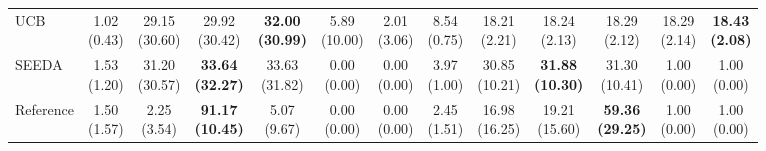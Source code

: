 {\begin{tabular}{l|cccccc|cccccc}
UCB & \makecell{1.02 \\ (0.43)} & {\cellcolor[HTML]{C8E6C9}} \makecell{29.15 \\ (30.60)} & \makecell{29.92 \\ (30.42)} & \bfseries \makecell{32.00 \\ (30.99)} & \makecell{5.89 \\ (10.00)} & \makecell{2.01 \\ (3.06)} & \makecell{8.54 \\ (0.75)} & {\cellcolor[HTML]{C8E6C9}} \makecell{18.21 \\ (2.21)} & \makecell{18.24 \\ (2.13)} & \makecell{18.29 \\ (2.12)} & \makecell{18.29 \\ (2.14)} & \bfseries \makecell{18.43 \\ (2.08)} \\
SEEDA & \makecell{1.53 \\ (1.20)} & {\cellcolor[HTML]{C8E6C9}} \makecell{31.20 \\ (30.57)} & \bfseries \makecell{33.64 \\ (32.27)} & \makecell{33.63 \\ (31.82)} & \makecell{0.00 \\ (0.00)} & \makecell{0.00 \\ (0.00)} & \makecell{3.97 \\ (1.00)} & {\cellcolor[HTML]{C8E6C9}} \makecell{30.85 \\ (10.21)} & \bfseries \makecell{31.88 \\ (10.30)} & \makecell{31.30 \\ (10.41)} & \makecell{1.00 \\ (0.00)} & \makecell{1.00 \\ (0.00)} \\
Reference & \makecell{1.50 \\ (1.57)} & {\cellcolor[HTML]{C8E6C9}} \makecell{2.25 \\ (3.54)} & \bfseries \makecell{91.17 \\ (10.45)} & \makecell{5.07 \\ (9.67)} & \makecell{0.00 \\ (0.00)} & \makecell{0.00 \\ (0.00)} & \makecell{2.45 \\ (1.51)} & {\cellcolor[HTML]{C8E6C9}} \makecell{16.98 \\ (16.25)} & \makecell{19.21 \\ (15.60)} & \bfseries \makecell{59.36 \\ (29.25)} & \makecell{1.00 \\ (0.00)} & \makecell{1.00 \\ (0.00)} \\

\end{tabular}}
